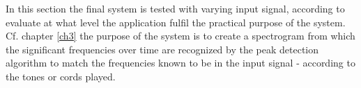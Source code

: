In this section the final system is tested with varying input signal, according to evaluate at what level the application fulfil the practical purpose of the system. Cf. chapter \ref{ch3} the purpose of the system is to create a spectrogram from which the significant frequencies over time are recognized by the peak detection algorithm to match the frequencies known to be in the input signal - according to the tones or cords played.\\
